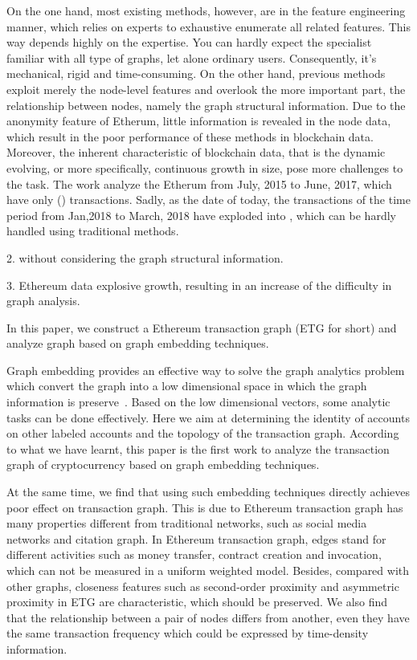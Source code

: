 On the one hand, most existing methods, however, are in the feature engineering manner, which relies on experts to exhaustive enumerate all related features. This way  depends highly on the expertise. You can hardly expect the specialist familiar with all type of graphs, let alone ordinary users. Consequently, it's mechanical, rigid and time-consuming. On the other hand, previous methods exploit merely  the node-level features and overlook the more important part, the relationship between nodes, namely the graph structural information. Due to  the anonymity feature of Etherum, little  information is revealed in the node data, which result in the poor performance of these methods in blockchain data.    Moreover, the  inherent characteristic of blockchain data, that is the dynamic evolving, or more specifically, continuous growth in size, pose more challenges to the task. The work \cite{chen2018infocom} analyze the Etherum   from  July, 2015 to June, 2017, which have only () transactions. Sadly, as the date of today, the transactions of the time period from Jan,2018 to March, 2018 have exploded into , which can be hardly handled using traditional methods.

2. without considering the graph structural information.

3. Ethereum data explosive growth, resulting in an increase of the difficulty in graph analysis. %


 In this paper, we construct a Ethereum transaction graph (ETG for short) and analyze graph based on graph embedding techniques.

 Graph embedding provides an effective way to solve the graph analytics problem which convert the graph into a low dimensional space in which the graph information is preserve~\cite{cai2018comprehensive}. Based on the low dimensional vectors, some analytic tasks can be done effectively. Here we aim at determining the identity of accounts on other labeled accounts and the topology of the transaction graph. According to what we have learnt, this paper is the first work to analyze the transaction graph of cryptocurrency based on graph embedding techniques.

At the same time, we find that using such embedding techniques directly achieves poor effect on transaction graph. This is due to Ethereum transaction graph has many properties different from traditional networks, such as social media networks and citation graph. In Ethereum transaction graph, edges stand for different activities such as money transfer, contract creation and invocation, which can not be measured in a uniform weighted model. Besides, compared with other graphs, closeness features such as second-order proximity and asymmetric proximity in ETG are characteristic, which should be preserved. We also find that the relationship between a pair of nodes differs from another, even they have the same transaction frequency which could be expressed by time-density information.

